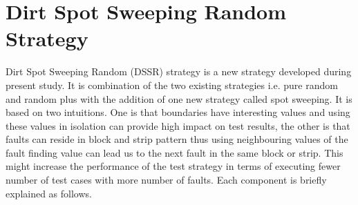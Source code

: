 \documentclass[conference]{IEEEtran}
\begin{document}

\section{Dirt Spot Sweeping Random Strategy}
Dirt Spot Sweeping Random (DSSR) strategy is a new strategy developed during present study. It is combination of the two existing strategies i.e. pure random and random plus with the addition of one new strategy called spot sweeping. It is based on two intuitions. One is that boundaries have interesting values and using these values in isolation can provide high impact on test results, the other is that faults can reside in block and strip pattern thus using neighbouring values of the fault finding value can lead us to the next fault in the same block or strip. This might increase the performance of the test strategy in terms of executing fewer number of test cases with more number of faults. Each component is briefly explained as follows. 
\end{document}
